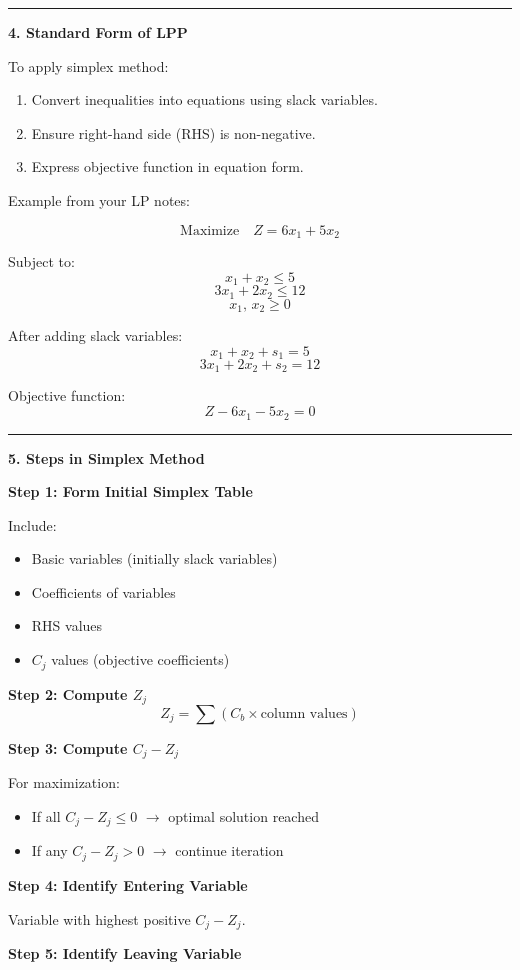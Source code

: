 \documentclass[10pt,a4paper]{article}
\newcommand{\separator}{\vspace{0.4em}\noindent\rule{\linewidth}{0.6pt}\vspace{0.4em}}
\begin{document}
\separator

\textbf{4. Standard Form of LPP}

To apply simplex method:
\begin{enumerate}
  \item Convert inequalities into equations using slack variables.
  \item Ensure right-hand side (RHS) is non-negative.
  \item Express objective function in equation form.
\end{enumerate}

Example from your LP notes:

\[
\text{Maximize} \quad Z = 6x_1 + 5x_2
\]

Subject to:
\[
x_1 + x_2 \leq 5
\]
\[
3x_1 + 2x_2 \leq 12
\]
\[
x_1,\, x_2 \geq 0
\]

After adding slack variables:
\[
x_1 + x_2 + s_1 = 5
\]
\[
3x_1 + 2x_2 + s_2 = 12
\]

Objective function:
\[
Z - 6x_1 - 5x_2 = 0
\]

\separator

\textbf{5. Steps in Simplex Method}

\textbf{Step 1: Form Initial Simplex Table}

Include:
\begin{itemize}
  \item Basic variables (initially slack variables)
  \item Coefficients of variables
  \item RHS values
  \item $C_j$ values (objective coefficients)
\end{itemize}

\textbf{Step 2: Compute $Z_j$}
\[
Z_j = \sum (C_b \times \text{column values})
\]

\textbf{Step 3: Compute $C_j - Z_j$}

For maximization:
\begin{itemize}
  \item If all $C_j - Z_j \leq 0$ $\rightarrow$ optimal solution reached
  \item If any $C_j - Z_j > 0$ $\rightarrow$ continue iteration
\end{itemize}

\textbf{Step 4: Identify Entering Variable}

Variable with highest positive $C_j - Z_j$.

\textbf{Step 5: Identify Leaving Variable}
\end{document}
